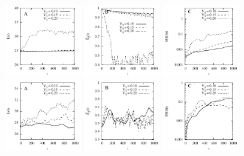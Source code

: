 \documentclass[aps,prl,preprint,groupedaddress]{revtex4-2}
\begin{document}
\begin{figure}
  \begin{center}
  \includegraphics[width=0.3\textwidth]{VTG_E.pdf}
   \includegraphics[width=0.3\textwidth]{VTG_LOP.pdf}
    \includegraphics[width=0.3\textwidth]{VTG_MSD.pdf}\\
  \includegraphics[width=0.3\textwidth]{BTG_E.pdf}
   \includegraphics[width=0.3\textwidth]{BTG_LOP.pdf}
    \includegraphics[width=0.3\textwidth]{BTG_MSD.pdf}

\end{center}
\end{figure}
\end{document}
